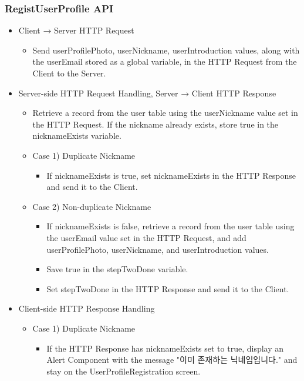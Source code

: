 \documentclass[conference]{IEEEtran}
\begin{document}
\subsubsection{RegistUserProfile API}
\begin{itemize}
    \item Client → Server HTTP Request
    \begin{itemize}
        \item Send userProfilePhoto, userNickname, userIntroduction values, along with the userEmail stored as a global variable, in the HTTP Request from the Client to the Server.
        \\
    \end{itemize}
    \item Server-side HTTP Request Handling, Server → Client HTTP Response
    \begin{itemize}
        \item Retrieve a record from the user table using the userNickname value set in the HTTP Request. If the nickname already exists, store true in the nicknameExists variable.
        \item Case 1) Duplicate Nickname
        \begin{itemize}
            \item If nicknameExists is true, set nicknameExists in the HTTP Response and send it to the Client.
        \end{itemize}
        \item Case 2) Non-duplicate Nickname
        \begin{itemize}
            \item If nicknameExists is false, retrieve a record from the user table using the userEmail value set in the HTTP Request, and add userProfilePhoto, userNickname, and userIntroduction values.
            \item Save true in the stepTwoDone variable.
            \item Set stepTwoDone in the HTTP Response and send it to the Client.
            \\
        \end{itemize}
    \end{itemize}
    \item Client-side HTTP Response Handling
    \begin{itemize}
        \item Case 1) Duplicate Nickname
        \begin{itemize}
            \item If the HTTP Response has nicknameExists set to true, display an Alert Component with the message "이미 존재하는 닉네임입니다." and stay on the UserProfileRegistration screen.

\end{itemize}
\end{itemize}
\end{itemize}
\end{document}
